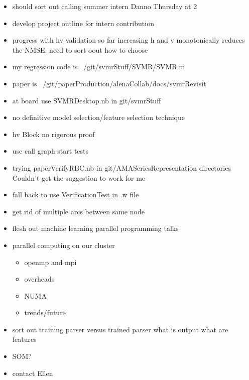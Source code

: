 \documentclass[hyperref]{labbook}
\begin{document}
\begin{itemize}
\item should sort out calling summer intern
Danno Thursday at 2
\item develop project outline for intern contribution
\item progress with hv validation  so far increasing h and v monotonically reduces the NMSE.  need to sort oout how to choose
\item my regression code is ~/git/svmrStuff/SVMR/SVMR.m
\item paper is ~/git/paperProduction/alenaCollab/docs/svmrRevisit
\item at board use SVMRDesktop.nb in git/svmrStuff
\item no definitive model selection/feature selection technique
\item hv Block no rigorous proof
\end{itemize}

\begin{itemize}
\item use  call graph start  tests 
\item trying paperVerifyRBC.nb in git/AMASeriesRepresentation directories  Couldn't get the suggestion to work for me 
\item fall back to use \href{http://reference.wolfram.com/language/guide/SystematicTestingAndVerification.html}{VerificationTest } in .w file
\item get rid of multiple arcs between same node
\end{itemize}


\begin{itemize}
\item flesh out machine learning parallel programming talks
\item parallel computing on our cluster
  \begin{itemize}
  \item openmp and mpi
  \item overheads
  \item NUMA
  \item trends/future
  \end{itemize}
\end{itemize}

\begin{itemize}
\item sort out training parser versus trained parser  what is output  what are features
\item SOM?
\item contact Ellen
\end{itemize}
\end{document}
